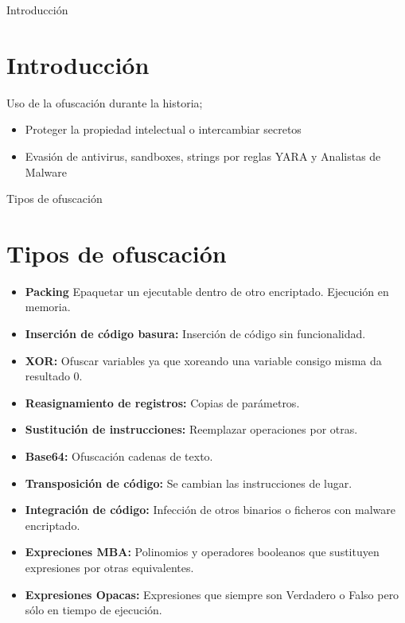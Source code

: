 \documentclass[aspectratio=169]{beamer}
\begin{document}
	
	\author{María San José Seco \href{https://github.com/drkrysSrng/freyja}{@drkrysSrng/freyja}} 
	\date{\today} 

	\begin{frame}[plain]
	
	
	    
	\end{frame}

	


	
	\begin{frame}{Introducción}
	 \section{Introducción}
		Uso de la ofuscación durante la historia;
		\begin{itemize}
			\item Proteger la propiedad intelectual o intercambiar secretos
			\item Evasión de antivirus, sandboxes, strings por reglas YARA y Analistas de Malware
		\end{itemize}
		\end{frame}
	
    \begin{frame}{Tipos de ofuscación}
    \section{Tipos de ofuscación}
	  	\begin{itemize}
	  		\item \textbf{Packing} Epaquetar un ejecutable dentro de otro encriptado. Ejecución en memoria.
	  		\item \textbf{Inserción de código basura:} Inserción de código sin funcionalidad.
  			\item \textbf{XOR:} Ofuscar variables ya que xoreando una variable consigo misma da resultado 0.
  			\item \textbf{Reasignamiento de registros:} Copias de parámetros.
  			\item \textbf{Sustitución de instrucciones:} Reemplazar operaciones por otras.
  			\item \textbf{Base64:} Ofuscación cadenas de texto.
  			\item \textbf{Transposición de código:} Se cambian las instrucciones de lugar.
  			\item \textbf{Integración de código:} Infección de otros binarios o ficheros con malware encriptado.
  			\item \textbf{Expreciones MBA:} Polinomios y operadores booleanos que sustituyen expresiones por otras equivalentes.
  			\item \textbf{Expresiones Opacas:} Expresiones que siempre son Verdadero o Falso pero sólo en tiempo de ejecución.
  			
  		\end{itemize}
	   \end{frame}
\end{document}
